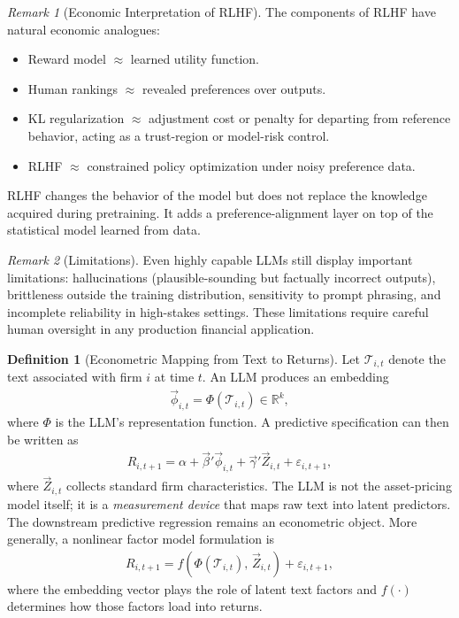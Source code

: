 \documentclass[11pt]{article}
\theoremstyle{definition}
\newtheorem{definition}{Definition}[section]
\theoremstyle{plain}
\theoremstyle{remark}
\newtheorem{remark}{Remark}[section]
\begin{document}
\begin{remark}[Economic Interpretation of RLHF]
    The components of RLHF have natural economic analogues:
    \begin{itemize}[noitemsep]
        \item Reward model $\approx$ learned utility function.
        \item Human rankings $\approx$ revealed preferences over outputs.
        \item KL regularization $\approx$ adjustment cost or penalty for departing from reference behavior, acting as a trust-region or model-risk control.
        \item RLHF $\approx$ constrained policy optimization under noisy preference data.
    \end{itemize}
    RLHF changes the behavior of the model but does not replace the knowledge acquired during pretraining. It adds a preference-alignment layer on top of the statistical model learned from data.
\end{remark}

\begin{remark}[Limitations]
    Even highly capable LLMs still display important limitations: hallucinations (plausible-sounding but factually incorrect outputs), brittleness outside the training distribution, sensitivity to prompt phrasing, and incomplete reliability in high-stakes settings. These limitations require careful human oversight in any production financial application.
\end{remark}

\begin{definition}[Econometric Mapping from Text to Returns]
    Let $\mathcal{T}_{i,t}$ denote the text associated with firm $i$ at time $t$. An LLM produces an embedding
    \begin{align}
        \vec{\phi}_{i,t} = \Phi(\mathcal{T}_{i,t}) \in \mathbb{R}^k,
    \end{align}
    where $\Phi$ is the LLM's representation function. A predictive specification can then be written as
    \begin{align}
        R_{i,t+1} = \alpha + \vec{\beta}'\vec{\phi}_{i,t} + \vec{\gamma}'\vec{Z}_{i,t} + \varepsilon_{i,t+1},
    \end{align}
    where $\vec{Z}_{i,t}$ collects standard firm characteristics. The LLM is not the asset-pricing model itself; it is a \emph{measurement device} that maps raw text into latent predictors. The downstream predictive regression remains an econometric object. More generally, a nonlinear factor model formulation is
    \begin{align}
        R_{i,t+1} = f\!\left(\Phi(\mathcal{T}_{i,t}),\, \vec{Z}_{i,t}\right) + \varepsilon_{i,t+1},
    \end{align}
    where the embedding vector plays the role of latent text factors and $f(\cdot)$ determines how those factors load into returns.
\end{definition}
\end{document}
